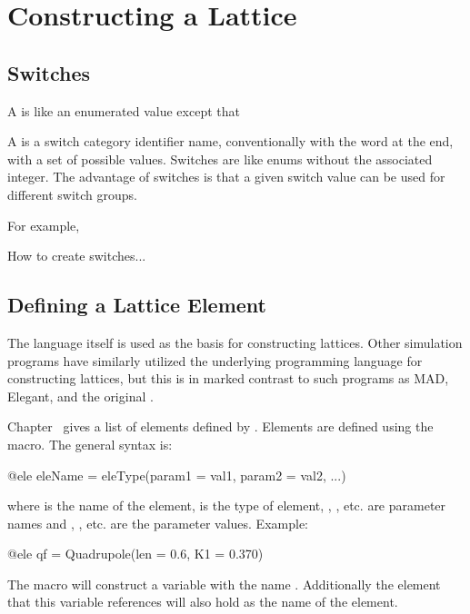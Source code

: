 \chapter{Constructing a Lattice}
\label{c:construct-lat}

\section{Switches}
\label{s:switch}

A  is like an enumerated value except that 


A  is a switch category identifier name, conventionally with the word  at the end, 
with a set of possible values. Switches are like enums without the associated integer. 
The advantage of switches is that a given switch value can be used for different switch groups. 

For example, 

How to create switches...





\section{Defining a Lattice Element}
\label{s:ele.def}

The \julia language itself is used as the basis for constructing lattices. Other simulation programs
have similarly utilized the underlying programming language for constructing lattices\cite{merlin++,xsuite},
but this is in marked contrast to such programs as MAD\cite{mad}, Elegant\cite{elegant}, and the 
original \bmad\cite{bmad-orig}. 

Chapter~ gives a list of elements defined by \Bmad. Elements are defined using the 
macro. The general syntax is:
\begin{example}
  @ele eleName = eleType(param1 = val1, param2 = val2, ...)
\end{example}
where  is the name of the element,  is the type of element, , ,
etc. are parameter names and , , etc. are the parameter values.
Example:
\begin{example}
  @ele qf = Quadrupole(len = 0.6, K1 = 0.370)
\end{example}
The  macro will construct a \julia variable with the name . Additionally the element
that this variable references will also hold  as the name of the element.

